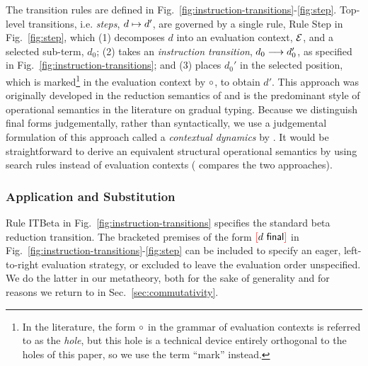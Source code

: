 

The transition rules are defined in Fig.~\ref{fig:instruction-transitions}-\ref{fig:step}. Top-level transitions, i.e. \emph{steps}, $d \mapsto d'$, are governed by a single rule, Rule {Step} in Fig.~\ref{fig:step}, which (1) decomposes $d$ into an evaluation context, $\mathcal{E}$, and a selected sub-term, $d_0$; (2) takes an \emph{instruction transition}, $d_0 \longrightarrow d_0'$, as specified in Fig.~\ref{fig:instruction-transitions}; and (3) places $d_0'$ in the selected position, which is marked\footnote{In the literature, the form $\circ$ in the grammar of evaluation contexts is referred to as the \emph{hole}, but this hole is a technical device entirely orthogonal to the holes of this paper, so we use the term ``mark'' instead.} in the evaluation context by $\circ$, to obtain $d'$. This approach was originally developed in the reduction semantics of \citet{DBLP:journals/tcs/FelleisenH92} and is the predominant style of operational semantics in the literature on gradual typing. Because we distinguish final forms judgementally, rather than syntactically, we use a judgemental formulation of this approach called a \emph{contextual dynamics} by \citet{pfpl}. It would be straightforward to derive an equivalent structural operational semantics \cite{DBLP:journals/jlp/Plotkin04a} by using search rules instead of evaluation contexts (\citet{pfpl} compares the two approaches).




\subsubsection{Application and Substitution} Rule {ITBeta} in Fig.~\ref{fig:instruction-transitions} specifies the standard beta reduction transition. The bracketed premises of the form ${\textcolor{red}[}d~\mathsf{final}{\textcolor{red}]}$ in Fig.~\ref{fig:instruction-transitions}-\ref{fig:step} can be included to specify an eager, left-to-right evaluation strategy, or excluded to leave the evaluation order unspecified. We do the latter in our metatheory, both for the sake of generality and for reasons we return to in Sec.~\ref{sec:commutativity}.

